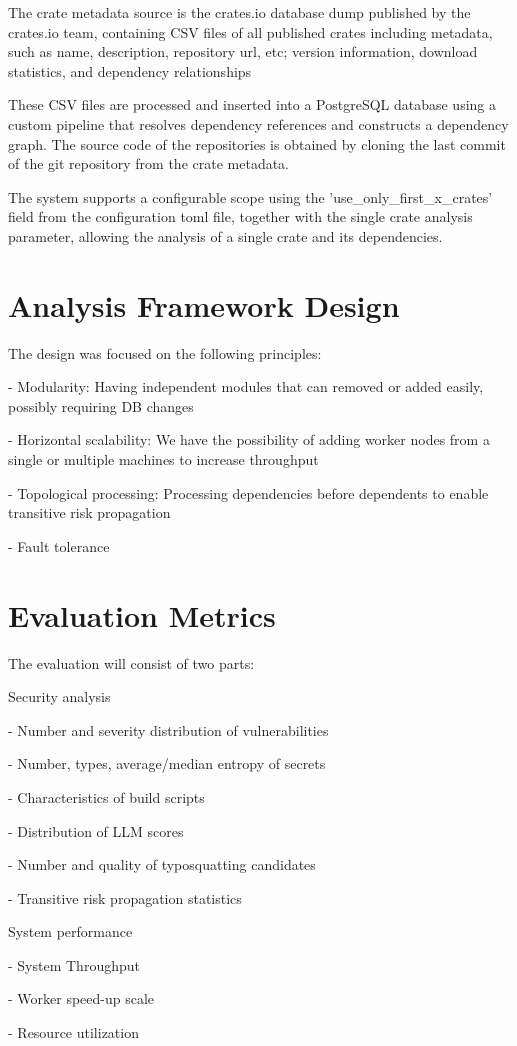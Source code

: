 The crate metadata source is the crates.io database dump published by the crates.io team, containing CSV files of all published crates including metadata, such as name, description, repository url, etc; version information, download statistics, and dependency relationships

These CSV files are processed and inserted into a PostgreSQL database using a custom pipeline that resolves dependency references and constructs a dependency graph. The source code of the repositories is obtained by cloning the last commit of the git repository from the crate metadata.

The system supports a configurable scope using the 'use\_only\_first\_x\_crates' field from the configuration toml file, together with the single crate analysis parameter, allowing the analysis of a single crate and its dependencies.

\section{Analysis Framework Design}\label{sect:framework-design}

The design was focused on the following principles:

- Modularity: Having independent modules that can removed or added easily, possibly requiring DB changes

- Horizontal scalability: We have the possibility of adding worker nodes from a single or multiple machines to increase throughput

- Topological processing: Processing dependencies before dependents to enable transitive risk propagation

- Fault tolerance

\section{Evaluation Metrics}\label{sect:evaluation-metrics}

The evaluation will consist of two parts:

Security analysis

- Number and severity distribution of vulnerabilities

- Number, types, average/median entropy of secrets

- Characteristics of build scripts

- Distribution of LLM scores

- Number and quality of typosquatting candidates

- Transitive risk propagation statistics

\break
System performance

- System Throughput

- Worker speed-up scale

- Resource utilization
